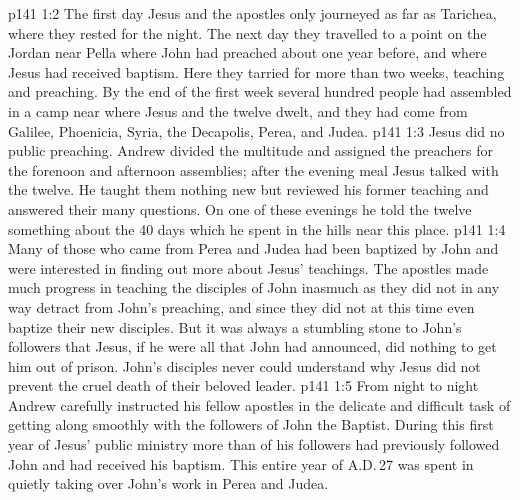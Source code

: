 \vs p141 1:2 The first day Jesus and the apostles only journeyed as far as Tarichea, where they rested for the night. The next day they travelled to a point on the Jordan near Pella where John had preached about one year before, and where Jesus had received baptism. Here they tarried for more than two weeks, teaching and preaching. By the end of the first week several hundred people had assembled in a camp near where Jesus and the twelve dwelt, and they had come from Galilee, Phoenicia, Syria, the Decapolis, Perea, and Judea.
\vs p141 1:3 Jesus did no public preaching. Andrew divided the multitude and assigned the preachers for the forenoon and afternoon assemblies; after the evening meal Jesus talked with the twelve. He taught them nothing new but reviewed his former teaching and answered their many questions. On one of these evenings he told the twelve something about the 40 days which he spent in the hills near this place.
\vs p141 1:4 Many of those who came from Perea and Judea had been baptized by John and were interested in finding out more about Jesus’ teachings. The apostles made much progress in teaching the disciples of John inasmuch as they did not in any way detract from John’s preaching, and since they did not at this time even baptize their new disciples. But it was always a stumbling stone to John’s followers that Jesus, if he were all that John had announced, did nothing to get him out of prison. John’s disciples never could understand why Jesus did not prevent the cruel death of their beloved leader.
\vs p141 1:5 From night to night Andrew carefully instructed his fellow apostles in the delicate and difficult task of getting along smoothly with the followers of John the Baptist. During this first year of Jesus’ public ministry more than  of his followers had previously followed John and had received his baptism. This entire year of A.D.\,27 was spent in quietly taking over John’s work in Perea and Judea.
